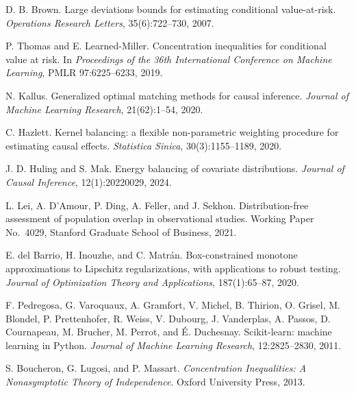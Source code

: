 D. B. Brown.
\newblock Large deviations bounds for estimating conditional value-at-risk.
\newblock \emph{Operations Research Letters}, 35(6):722--730, 2007.

P. Thomas and E. Learned-Miller.
\newblock Concentration inequalities for conditional value at risk.
\newblock In \emph{Proceedings of the 36th International Conference on Machine Learning}, PMLR 97:6225--6233, 2019.

N. Kallus.
\newblock Generalized optimal matching methods for causal inference.
\newblock \emph{Journal of Machine Learning Research}, 21(62):1--54, 2020.

C. Hazlett.
\newblock Kernel balancing: a flexible non-parametric weighting procedure for estimating causal effects.
\newblock \emph{Statistica Sinica}, 30(3):1155--1189, 2020.

J. D. Huling and S. Mak.
\newblock Energy balancing of covariate distributions.
\newblock \emph{Journal of Causal Inference}, 12(1):20220029, 2024.

L. Lei, A. D'Amour, P. Ding, A. Feller, and J. Sekhon.
\newblock Distribution-free assessment of population overlap in observational studies.
\newblock Working Paper No.~4029, Stanford Graduate School of Business, 2021.

E. del Barrio, H. Inouzhe, and C. Matr\'an.
\newblock Box-constrained monotone approximations to Lipschitz regularizations, with applications to robust testing.
\newblock \emph{Journal of Optimization Theory and Applications}, 187(1):65--87, 2020.

F. Pedregosa, G. Varoquaux, A. Gramfort, V. Michel, B. Thirion, O. Grisel, M. Blondel, P. Prettenhofer, R. Weiss, V. Dubourg, J. Vanderplas, A. Passos, D. Cournapeau, M. Brucher, M. Perrot, and {\'E}. Duchesnay.
\newblock Scikit-learn: machine learning in {P}ython.
\newblock \emph{Journal of Machine Learning Research}, 12:2825--2830, 2011.

S. Boucheron, G. Lugosi, and P. Massart.
\newblock \emph{Concentration Inequalities: A Nonasymptotic Theory of Independence}.
\newblock Oxford University Press, 2013.

